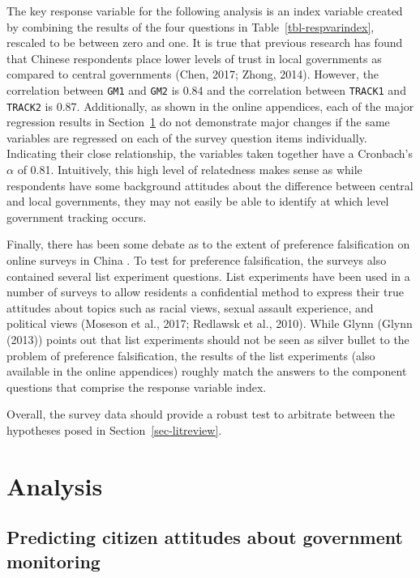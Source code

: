 \documentclass[
  letterpaper,
  DIV=11,
  numbers=noendperiod]{scrartcl}
\begin{document}
The key response variable for the following analysis is an index
variable created by combining the results of the four questions in
Table~\ref{tbl-respvarindex}, rescaled to be between zero and one. It is
true that previous research has found that Chinese respondents place
lower levels of trust in local governments as compared to central
governments (Chen, 2017; Zhong, 2014). However, the correlation between
\texttt{GM1} and \texttt{GM2} is 0.84 and the correlation between
\texttt{TRACK1} and \texttt{TRACK2} is 0.87. Additionally, as shown in
the online appendices, each of the major regression results in
Section~\ref{sec-analysis} do not demonstrate major changes if the same
variables are regressed on each of the survey question items
individually. Indicating their close relationship, the variables taken
together have a Cronbach's \(\alpha\) of 0.81. Intuitively, this high
level of relatedness makes sense as while respondents have some
background attitudes about the difference between central and local
governments, they may not easily be able to identify at which level
government tracking occurs.

Finally, there has been some debate as to the extent of preference
falsification on online surveys in China . To test for preference
falsification, the surveys also contained several list experiment
questions. List experiments have been used in a number of surveys to
allow residents a confidential method to express their true attitudes
about topics such as racial views, sexual assault experience, and
political views (Moseson et al., 2017; Redlawsk et al., 2010). While
Glynn (Glynn (2013)) points out that list experiments should not be seen
as silver bullet to the problem of preference falsification, the results
of the list experiments (also available in the online appendices)
roughly match the answers to the component questions that comprise the
response variable index.

Overall, the survey data should provide a robust test to arbitrate
between the hypotheses posed in Section~\ref{sec-litreview}.

\section{Analysis}\label{sec-analysis}

\subsection{Predicting citizen attitudes about government
monitoring}\label{predicting-citizen-attitudes-about-government-monitoring}
\end{document}
